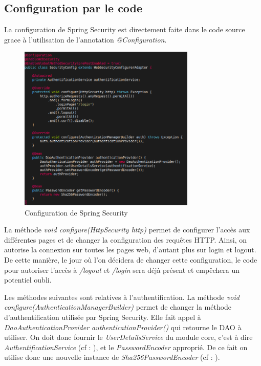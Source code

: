 		\subsection{Configuration par le code}
			\label{subsec:webapp_configCode}

			La configuration de Spring Security est directement faite dans le code source grace à l'utilisation de l'annotation \textit{@Configuration}.

			\begin{figure}[H]
				\centering\includegraphics[width=0.75\textwidth, keepaspectratio]{res/SecurityConfig.png}
				\caption{Configuration de Spring Security}
			\end{figure}

			La méthode \textit{void configure(HttpSecurity http)} permet de configurer l'accès aux différentes pages et de changer la configuration des requêtes HTTP. Ainsi, on autorise la connexion sur toutes les pages web, d'autant plus sur login et logout. De cette manière, le jour où l'on décidera de changer cette configuration, le code pour autoriser l'accès à \textit{/logout} et \textit{/login} sera déjà présent et empêchera un potentiel oubli.

			Les méthodes suivantes sont relatives à l'authentification. La méthode \textit{void configure(AuthenticationManagerBuilder)} permet de changer la méthode d'authentification utilisée par Spring Security. Elle fait appel à \textit{DaoAuthenticationProvider authenticationProvider()} qui retourne le DAO à utiliser. On doit donc fournir le \textit{UserDetailsService} du module core, c'est à dire \textit{AuthentificationService} (cf : ), et le \textit{PasswordEncoder} approprié. De ce fait on utilise donc une nouvelle instance de \textit{Sha256PasswordEncoder} (cf : ).

